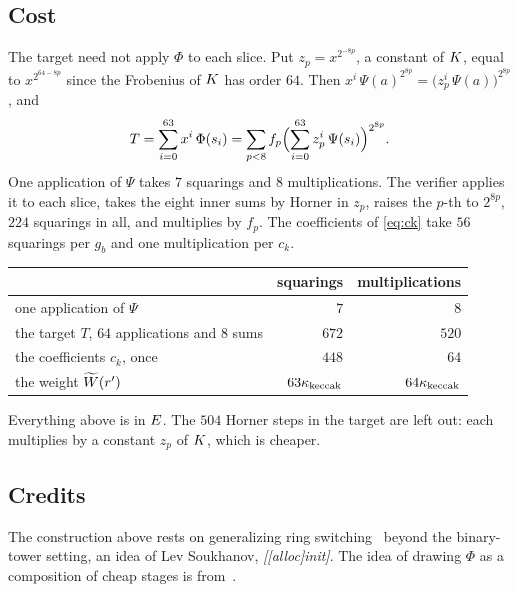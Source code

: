 \subsection{Cost}\label{rs:cost}

The target need not apply $\Phi$ to each slice. Put $z_p=x^{2^{-8p}}$, a constant of $K$, equal to $x^{2^{64-8p}}$ since the Frobenius of $K$ has order $64$. Then $x^i\,\Psi(a)^{2^{8p}}=\bigl(z_p^i\,\Psi(a)\bigr)^{2^{8p}}$, and
\[
T=\sum_{i=0}^{63}x^i\,\Phi(s_i)=\sum_{p<8}f_p\Bigl(\sum_{i=0}^{63}z_p^i\,\Psi(s_i)\Bigr)^{2^{8p}}.
\]
One application of $\Psi$ takes $7$ squarings and $8$ multiplications. The verifier applies it to each slice, takes the eight inner sums by Horner in $z_p$, raises the $p$-th to $2^{8p}$, $224$ squarings in all, and multiplies by $f_p$. The coefficients of \eqref{eq:ck} take $56$ squarings per $g_b$ and one multiplication per $c_k$.

\begin{center}
\begin{tabular}{lrr}
& squarings & multiplications\\[2pt]
\hline
one application of $\Psi$ & $7$ & $8$\\
the target $T$, $64$ applications and $8$ sums & $672$ & $520$\\
the coefficients $c_k$, once & $448$ & $64$\\
the weight $\widetilde{W}(r')$ & $63\kappa_{\mathrm{keccak}}$ & $64\kappa_{\mathrm{keccak}}$\\
\end{tabular}
\end{center}

Everything above is in $E$. The $504$ Horner steps in the target are left out: each multiplies by a constant $z_p$ of $K$, which is cheaper.

\subsection{Credits}\label{rs:credits}

The construction above rests on generalizing ring switching~\cite{DP24} beyond the binary-tower setting, an idea of Lev Soukhanov, \textit{[[alloc]init]}. The idea of drawing $\Phi$ as a composition of cheap stages is from~\cite{Flock26}.
